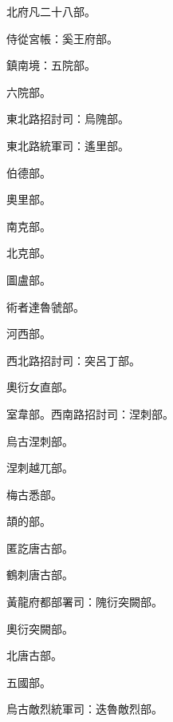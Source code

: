\begin{pinyinscope}
 北府凡二十八部。



 侍從宮帳：奚王府部。



 鎮南境：五院部。



 六院部。



 東北路招討司：烏隗部。



 東北路統軍司：遙里部。



 伯德部。



 奧里部。



 南克部。



 北克部。



 圖盧部。



 術者達魯虢部。



 河西部。



 西北路招討司：突呂丁部。



 奧衍女直部。



 室韋部。西南路招討司：涅刺部。



 烏古涅刺部。



 涅刺越兀部。



 梅古悉部。



 頡的部。



 匿訖唐古部。



 鶴刺唐古部。



 黃龍府都部署司：隗衍突闕部。



 奧衍突闕部。



 北唐古部。



 五國部。



 烏古敵烈統軍司：迭魯敵烈部。




\end{pinyinscope}
